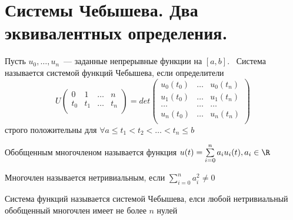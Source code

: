  \section{Системы Чебышева. Два эквивалентных определения.}

 \begin{dfn}
Пусть $u_0, …, u_n$ — заданные непрерывные функции на $[a,b]$.  Система называется системой функций Чебышева, если 
определители
$$U\left(
\begin{array}{cccc}
0 & 1 & … & n \\
t_0 & t_1 & … & t_n\\
\end{array}  \right) = det \left(
\begin{array}{ccc}
u_0(t_0) & … & u_0(t_n) \\
u_1(t_0) & … & u_1(t_n) \\
… & … & … \\
u_n(t_0) & … & u_n(t_n) \\
\end{array}
 \right)
 $$
 строго положительны для $\forall a \leq t_1 < t_2 < … < t_n \leq b$
 \end{dfn}
 \begin{dfn}
Обобщенным многочленом называется функция $u(t) = \sum \limits_{i=0}^n a_iu_i(t), a_i \in \R$
 \end{dfn}

\begin{dfn}
Многочлен называется нетривиальным, если $\sum \limits_{i=0}^n a_i^2 \neq 0$
\end{dfn}

\begin{dfn}
Система функций называется системой Чебышева, елси любой нетривиальный обобщенный многочлен имеет не более $n$ нулей
\end{dfn}


